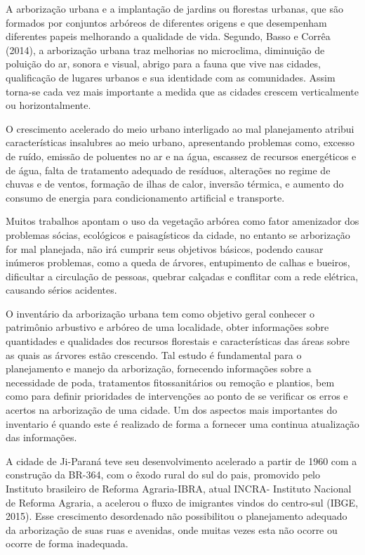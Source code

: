 \documentclass[article,12pt,onesidea,4paper,english,brazil]{abntex2}
\begin{document}
A arborização urbana e a implantação de jardins ou florestas urbanas, que são formados por conjuntos arbóreos de diferentes origens e que desempenham diferentes papeis melhorando a qualidade de vida. Segundo, Basso e Corrêa (2014), a arborização urbana traz melhorias no microclima, diminuição de poluição do ar, sonora e visual, abrigo para a fauna que vive nas cidades, qualificação de lugares urbanos e sua identidade com as comunidades. Assim torna-se cada vez mais importante a medida que as cidades crescem verticalmente ou horizontalmente.

	O crescimento acelerado do meio urbano interligado ao mal planejamento atribui características insalubres ao meio urbano, apresentando problemas como, excesso de ruído, emissão de poluentes no ar e na água, escassez de recursos energéticos e de água, falta de tratamento adequado de resíduos, alterações no regime de chuvas e de ventos, formação de ilhas de calor, inversão térmica, e aumento do consumo de energia para condicionamento artificial e transporte.
	
	Muitos trabalhos apontam o uso da vegetação arbórea como fator amenizador dos problemas sócias, ecológicos e paisagísticos da cidade, no entanto se arborização for mal planejada, não irá cumprir seus objetivos básicos, podendo causar inúmeros problemas, como a queda de árvores, entupimento de calhas e bueiros, dificultar a circulação de pessoas, quebrar calçadas e conflitar com a rede elétrica, causando sérios acidentes.
	
	O inventário da arborização urbana tem como objetivo geral conhecer o patrimônio arbustivo e arbóreo de uma localidade, obter informações sobre quantidades e qualidades dos recursos florestais e características das áreas sobre as quais as árvores estão crescendo. Tal estudo é fundamental para o planejamento e manejo da arborização, fornecendo informações sobre a necessidade de poda, tratamentos fitossanitários ou remoção e plantios, bem como para definir prioridades de intervenções ao ponto de se verificar os erros e acertos na arborização de uma cidade. Um dos aspectos mais importantes do inventario é quando este é realizado de forma a fornecer uma continua atualização das informações.
	
	A cidade de Ji-Paraná teve seu desenvolvimento acelerado a partir de 1960 com a construção da BR-364, com o êxodo rural do sul do pais, promovido pelo Instituto brasileiro de Reforma Agraria-IBRA, atual INCRA- Instituto Nacional de Reforma Agraria, a acelerou o fluxo de imigrantes vindos do centro-sul (IBGE, 2015). Esse crescimento desordenado não possibilitou o planejamento adequado da arborização de suas ruas e avenidas, onde muitas vezes esta não ocorre ou ocorre de forma inadequada.
	
\end{document}
